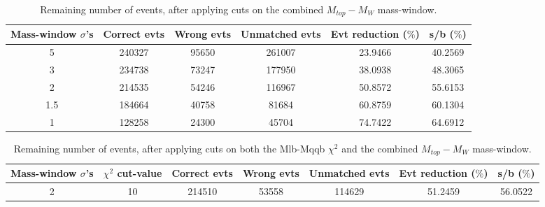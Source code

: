 \documentclass{article}
\begin{document}
 \begin{table}[h!t] 
  \caption{Remaining number of events, after applying cuts on the combined $M_{top}-M_{W}$ mass-window.} 
  \centering 
   \begin{tabular}{c|c|c|c|c|c} 
     Mass-window $\sigma$'s & Correct evts    & Wrong evts     & Unmatched evts  & Evt reduction ($\%$)   & s/b ($\%$)     \\ 
     \hline
     5 & 240327  &  95650  &  261007  &  23.9466 &  40.2569 \\ 
     3 & 234738  &  73247  &  177950  &  38.0938 &  48.3065 \\ 
     2 & 214535  &  54246  &  116967  &  50.8572 &  55.6153 \\ 
     1.5 & 184664  &  40758  &  81684  &  60.8759 &  60.1304 \\ 
     1 & 128258  &  24300  &  45704  &  74.7422 &  64.6912
   \end{tabular} 
 \end{table} 
 
 \begin{table}[h!t] 
  \caption{Remaining number of events, after applying cuts on both the Mlb-Mqqb $\chi^{2}$ and the combined $M_{top}-M_{W}$ mass-window.} 
  \centering 
   \begin{tabular}{c|c|c|c|c|c|c} 
     Mass-window $\sigma$'s & $\chi^{2}$ cut-value    & Correct evts    & Wrong evts     & Unmatched evts  & Evt reduction ($\%$)    & s/b ($\%$)     \\ 
     \hline
     2 & 10 & 214510 & 53558 & 114629 & 51.2459 & 56.0522

   \end{tabular} 
 \end{table} 
 
\end{document}
